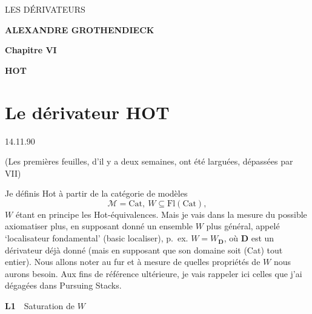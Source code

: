 \documentclass[11pt]{article}
\newcommand{\printedpage}[1]{\marginpar{\footnotesize p.~#1}}
\newcommand{\msp}[1]{\marginpar{\footnotesize [#1]}}
\begin{document}
\begin{center}
\printedpage{[sans numéro]}%

\vspace*{6cm}

{\Large\textsf{LES DÉRIVATEURS}}

\bigskip

\textbf{ALEXANDRE GROTHENDIECK}

\vspace{2cm}

\textbf{Chapitre VI}

\medskip

\textbf{HOT}
\end{center}

\clearpage


\noindent\printedpage{1}
\msp{page 1}

\section*{\normalsize Le dérivateur \textmd{HOT}}

\begin{flushright}
14.11.90
\end{flushright}

\begin{flushright}
(Les premières feuilles, d'il y a deux semaines, ont été larguées, dépassées par VII)
\end{flushright}

\noindent Je définis Hot à partir de la catégorie de modèles
\[
\mathcal{M} = \mathrm{Cat},\ W \subseteq \mathrm{Fl}(\mathrm{Cat}),
\]
$W$ étant en principe les Hot-équivalences. Mais je vais dans la mesure du possible axiomatiser plus, en supposant donné un ensemble $W$ plus général, appelé `localisateur fondamental' (basic localiser), p.~ex. $W = W_{\mathbf{D}}$, où $\mathbf{D}$ est un dérivateur déjà donné (mais en supposant que son domaine soit (Cat) tout entier). Nous allons noter au fur et à mesure de quelles propriétés de $W$ nous aurons besoin. Aux fins de référence ultérieure, je vais rappeler ici celles que j'ai dégagées dans Pursuing Stacks.

\noindent\textbf{L1}\ \ Saturation de $W$
\end{document}
